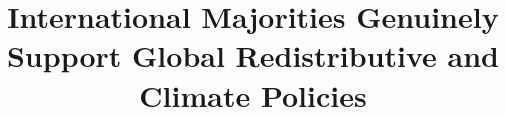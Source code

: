 

% 



% 
% 

% 


\title{International Majorities Genuinely Support Global Redistributive and Climate Policies
} 

